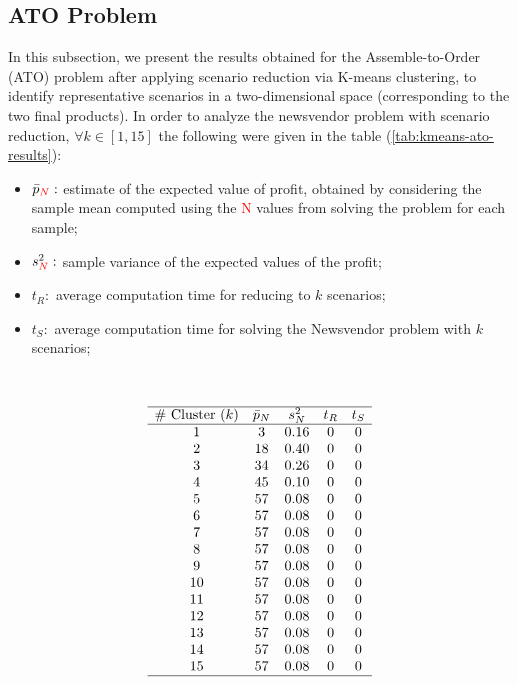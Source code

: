\documentclass[a4paper,12pt]{article}
\begin{document}
	
	\subsection{ATO Problem}
	In this subsection, we present the results obtained for the Assemble-to-Order (ATO) problem after applying scenario reduction via K-means clustering, to identify representative scenarios in a two-dimensional space (corresponding to the two final products). In order to analyze the newsvendor problem with scenario reduction, $\forall k \in [1,15]$ the following were given in the table (\ref{tab:kmeans-ato-results}):
	\begin{itemize}
		\item $\bar{p}_{\textcolor{red}{N}}:$ estimate of the expected value of profit, obtained by considering the sample mean computed using the \textcolor{red}{N} values from solving the problem for each sample; 
		\item $s^{2}_{\textcolor{red}{N}}:$ sample variance of the expected values of the profit;
		\item $t_{R}:$ average computation time for reducing to $k$ scenarios;
		\item $t_{S}:$ average computation time for solving the Newsvendor problem with $k$ scenarios;
	\end{itemize}~
	
	\[
	\begin{array}{ccccc}
		\hline
		\text{\# Cluster $(k)$} & \text{$\bar{p}_{N}$} & \text{$s_{N}^{2}$} & \text{$t_{R}$} & \text{$t_{S}$}\\
		\hline
		1 & 3 & 0.16 & 0 & 0\\
		2 & 18 & 0.40 & 0 & 0\\
		3 & 34 & 0.26 & 0 & 0\\
		4 & 45 & 0.10 & 0 & 0\\
		5 & 57 & 0.08 & 0 & 0\\
		6 & 57 & 0.08 & 0 & 0\\
		7 & 57 & 0.08 & 0 & 0\\
		8 & 57 & 0.08 & 0 & 0\\
		9 & 57 & 0.08 & 0 & 0\\
		10 & 57 & 0.08 & 0 & 0\\
		11 & 57 & 0.08 & 0 & 0\\
		12 & 57& 0.08 & 0 & 0\\
		13 & 57 & 0.08 & 0 & 0\\
		14 & 57 & 0.08 & 0 & 0\\
		15 & 57 & 0.08 & 0 & 0\\
		\hline
	\end{array}
	\]
	\label{tab:kmeans-ato-results}
	
\end{document}
